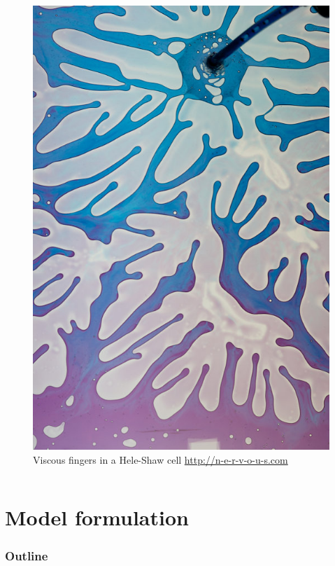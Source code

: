 \documentclass[screen, aspectratio=43]{beamer}
\begin{document}
\begin{frame}
{\begin{columns}
\begin{column}{0.25\textwidth}
\begin{figure}[h]
          \includegraphics[trim={0 0 5cm 0}, clip, width = \textwidth]{figures/misc/mf}
          \caption{\scriptsize Viscous fingers in a Hele-Shaw cell
            {\tiny \url{http://n-e-r-v-o-u-s.com}}}
        \end{figure}
      \end{column}
    \end{columns}
  }
\end{frame}

\section{Model formulation}

\begin{frame}
  \frametitle{Outline}
  \tableofcontents[currentsection]
\end{frame}
\end{document}
